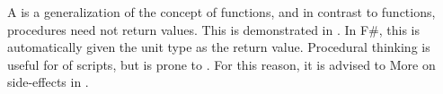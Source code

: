 \documentclass[fsharpNotes.tex]{subfiles}
\begin{document}
A  is a generalization of the concept of functions, and in contrast to functions, procedures need not return values. This is demonstrated in .
%
%
In F\#, this is automatically given the unit type as the return value. Procedural thinking is useful for  of scripts, but is prone to . 
For this reason, it is advised to   More on side-effects in .
\end{document}
